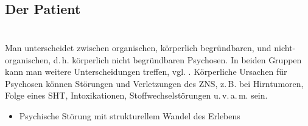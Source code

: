 \subsection{Der  Patient}







\bigskip

\section{}

\subsection{}
\label{topic:psychose}

{
Man unterscheidet zwischen organischen, körperlich
begründbaren, und nicht-organischen, d.\,h. körperlich nicht
begründbaren Psychosen. In beiden Gruppen kann man weitere
Unterscheidungen treffen, vgl.
. Körperliche Ursachen für Psychosen
können Störungen und Verletzungen des ZNS, z.\,B. bei
Hirntumoren, Folge eines SHT, Intoxikationen,
Stoffwechselstörungen u.\,v.\,a.\,m. sein.}
{%
\begin{itemize}
  \item Psychische Störung mit strukturellem Wandel des Erlebens
\end{itemize}
}


\begin{Synopsis}
\end{Synopsis}

